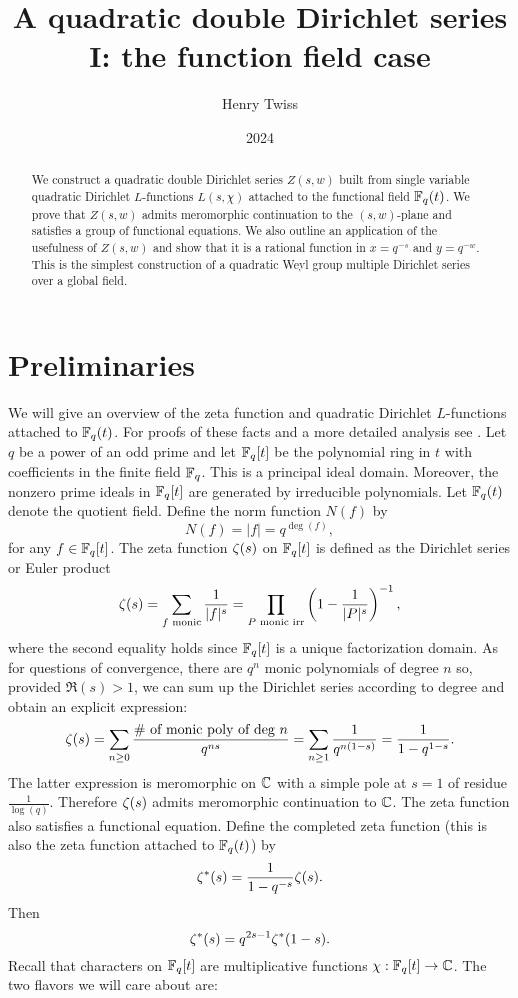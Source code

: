 \documentclass[12pt,reqno,oneside]{amsart}
\title{A quadratic double Dirichlet series I: the function field case}
\author{Henry Twiss}
\date{2024}
\begin{document}
\begin{abstract}
    We construct a quadratic double Dirichlet series $Z(s,w)$ built from single variable quadratic Dirichlet $L$-functions $L(s,\chi)$ attached to the functional field $\mathbb{F}_{q}(t)$. We prove that $Z(s,w)$ admits meromorphic continuation to the $(s,w)$-plane and satisfies a group of functional equations. We also outline an application of the usefulness of $Z(s,w)$ and show that it is a rational function in $x = q^{-s}$ and $y = q^{-w}$. This is the simplest construction of a quadratic Weyl group multiple Dirichlet series over a global field.
\end{abstract}

\maketitle

\section{Preliminaries}
    We will give an overview of the zeta function and quadratic Dirichlet $L$-functions attached to $\mathbb{F}_{q}(t)$. For proofs of these facts and a more detailed analysis see \cite{R}. Let $q$ be a power of an odd prime and let $\mathbb{F}_{q}[t]$ be the polynomial ring in $t$ with coefficients in the finite field $\mathbb{F}_{q}$. This is a principal ideal domain. Moreover, the nonzero prime ideals in $\mathbb{F}_{q}[t]$ are generated by irreducible polynomials. Let $\mathbb{F}_{q}(t)$ denote the quotient field. Define the norm function $N(f)$ by
    \[
        N(f) = |f| = q^{\deg(f)},
    \]
    for any $f \in \mathbb{F}_{q}[t]$. The zeta function $\zeta(s)$ on $\mathbb{F}_{q}[t]$ is defined as the Dirichlet series or Euler product
    \[
        \zeta(s) = \sum_{\text{$f$ monic}}\frac{1}{|f|^{s}} = \prod_{\text{$P$ monic irr}}\left(1-\frac{1}{|P|^{s}}\right)^{-1},
    \]
    where the second equality holds since $\mathbb{F}_{q}[t]$ is a unique factorization domain. As for questions of convergence, there are $q^{n}$ monic polynomials of degree $n$ so, provided $\Re(s) > 1$, we can sum up the Dirichlet series according to degree and obtain an explicit expression:
    \[
        \zeta(s) = \sum_{n \ge 0}\frac{\text{\# of monic poly of deg $n$}}{q^{ns}} = \sum_{n \ge 1}\frac{1}{q^{n(1-s)}} = \frac{1}{1-q^{1-s}}.
    \]
    The latter expression is meromorphic on $\mathbb{C}$ with a simple pole at $s = 1$ of residue $\frac{1}{\log(q)}$. Therefore $\zeta(s)$ admits meromorphic continuation to $\mathbb{C}$. The zeta function also satisfies a functional equation. Define the completed zeta function (this is also the zeta function attached to $\mathbb{F}_{q}(t)$) by
    \[
        \zeta^{\ast}(s) = \frac{1}{1-q^{-s}}\zeta(s).
    \]
    Then
    \[
        \zeta^{\ast}(s) = q^{2s-1}\zeta^{\ast}(1-s).
    \]
    Recall that characters on $\mathbb{F}_{q}[t]$ are multiplicative functions $\chi:\mathbb{F}_{q}[t] \to \mathbb{C}$. The two flavors we will care about are:
    
\end{document}
